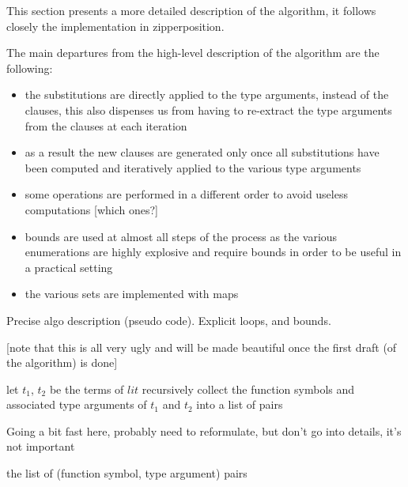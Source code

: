 \documentclass{article}
\begin{document}
This section presents a more detailed description of the algorithm, it follows closely the implementation in zipperposition.

The main departures from the high-level description of the algorithm are the following:
\begin{itemize}
   \item the substitutions are directly applied to the type arguments, instead of the clauses, this also dispenses us from having to re-extract the type arguments from the clauses at each iteration
   \item as a result the new clauses are generated only once all substitutions have been computed and iteratively applied to the various type arguments
   \item some operations are performed in a different order to avoid useless computations [which ones?]
   \item bounds are used at almost all steps of the process as the various enumerations are highly explosive and require bounds in order to be useful in a practical setting
   \item the various sets are implemented with maps
\end{itemize}

Precise algo description (pseudo code). Explicit loops, and bounds.

[note that this is all very ugly and will be made beautiful once the first draft (of the algorithm) is done]

\begin{algorithm}
\begin{algorithmic}[1]

   \State let \(t_1\), \(t_2\) be the terms of \(lit\)
   \State recursively collect the function symbols and associated type arguments of \(t_1\) and \(t_2\) into a list of pairs

   \State \Comment Going a bit fast here, probably need to reformulate, but don't go into details, it's not important

   \State \Return the list of (function symbol, type argument) pairs

\EndFunction
\end{algorithmic}
\end{algorithm}
\end{document}
